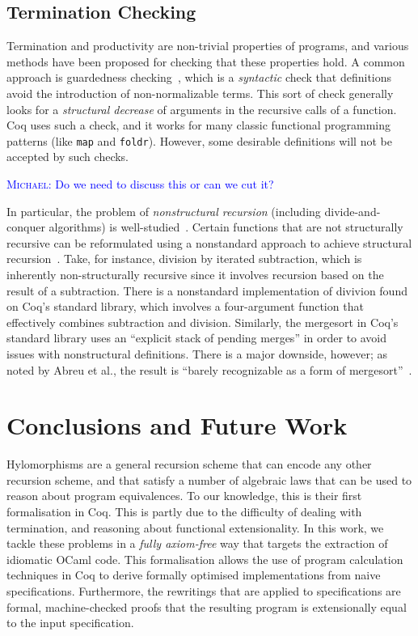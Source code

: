 \documentclass{llncs}
\newcommand{\mvol}[1]{\textcolor{blue}{\textsc{Michael}: #1}}
\newcommand{\haskell}[1]{\texttt{#1}}
\begin{document}
\subsection{Termination Checking}\label{sec:termcheck}

Termination and productivity are non-trivial properties of programs, and various
methods have been proposed for checking that these properties hold. A common
approach is guardedness checking~\cite{Eduardo94}, which is a
\emph{syntactic} check that definitions avoid the introduction of
non-normalizable terms. This sort of check generally looks for a
\emph{structural decrease} of arguments in the recursive calls of a function.
Coq uses such a check, and it works for many classic functional programming
patterns (like \haskell{map} and \haskell{foldr}). However, some desirable
definitions will not be accepted by such checks.

\mvol{Do we need to discuss this or can we cut it?}

In particular, the problem of \emph{nonstructural recursion} (including
divide-and-conquer algorithms) is well-studied~\cite{BoveKS16}.
Certain functions that are not structurally recursive can be reformulated using
a nonstandard approach to achieve structural recursion~\cite{AbreuDHJMS23}.
Take, for instance, division by iterated subtraction, which is inherently
non-structurally recursive since it involves recursion based on the result of a
subtraction. There is a nonstandard implementation of divivion found on Coq's
standard library, which involves a four-argument function that effectively
combines subtraction and division. Similarly, the mergesort in Coq's standard
library uses an ``explicit stack of pending merges'' in order to avoid issues
with nonstructural definitions. There is a major downside, however; as noted by
Abreu et al., the result is ``barely recognizable as a form of
mergesort''~\cite{AbreuDHJMS23}.

\section{Conclusions and Future Work}

Hylomorphisms are a general recursion scheme that can encode any other
recursion scheme, and that satisfy a number of algebraic laws that can be used
to reason about program equivalences. To our knowledge, this is their first formalisation
in Coq. This is partly due to the
difficulty of dealing with termination, and reasoning about functional
extensionality. In this work, we tackle these problems in a \emph{fully
axiom-free} way that targets the extraction of idiomatic OCaml code.  This
formalisation allows the use of program calculation techniques in Coq to derive
formally optimised implementations from naive specifications. Furthermore, the
rewritings that are applied to specifications are formal, machine-checked
proofs that the resulting program is extensionally equal to the input
specification. 
\end{document}
